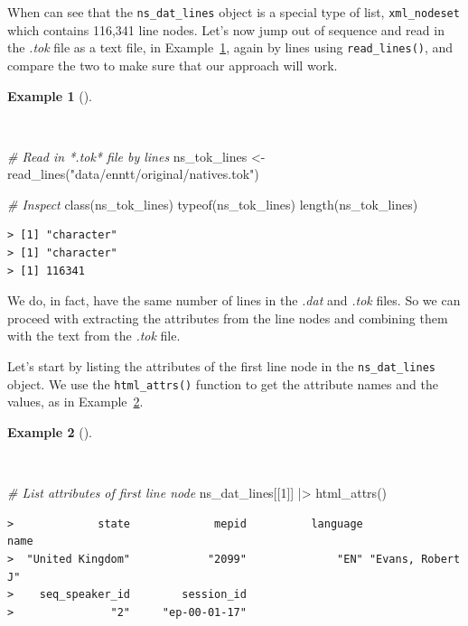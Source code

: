\documentclass[
  letterpaper,
  DIV=11,
  numbers=noendperiod]{scrreport}
\newenvironment{Shaded}{\begin{snugshade}}{\end{snugshade}}
\newcommand{\CommentTok}[1]{\textcolor[rgb]{0.00,0.00,0.00}{\textit{#1}}}
\newcommand{\DecValTok}[1]{\textcolor[rgb]{0.00,0.00,0.00}{#1}}
\newcommand{\FunctionTok}[1]{\textcolor[rgb]{0.00,0.00,0.00}{#1}}
\newcommand{\NormalTok}[1]{\textcolor[rgb]{0.00,0.00,0.00}{#1}}
\newcommand{\OtherTok}[1]{\textcolor[rgb]{0.00,0.00,0.00}{#1}}
\newcommand{\SpecialCharTok}[1]{\textcolor[rgb]{0.00,0.00,0.00}{#1}}
\newcommand{\StringTok}[1]{\textcolor[rgb]{0.00,0.00,0.00}{#1}}
\theoremstyle{definition}
\newtheorem{example}{Example}[chapter]
\theoremstyle{remark}
\begin{document}
When can see that the \texttt{ns\_dat\_lines} object is a special type
of list, \texttt{xml\_nodeset} which contains 116,341 line nodes. Let's
now jump out of sequence and read in the \emph{.tok} file as a text
file, in Example~\ref{exm-cd-enntt-read-lines}, again by lines using
\texttt{read\_lines()}, and compare the two to make sure that our
approach will work.

\begin{example}[]\protect\hypertarget{exm-cd-enntt-read-lines}{}\label{exm-cd-enntt-read-lines}

~

\begin{Shaded}
\begin{Highlighting}[]
\CommentTok{\# Read in *.tok* file by lines}
\NormalTok{ns\_tok\_lines }\OtherTok{\textless{}{-}} 
  \FunctionTok{read\_lines}\NormalTok{(}\StringTok{"data/enntt/original/natives.tok"}\NormalTok{)}

\CommentTok{\# Inspect}
\FunctionTok{class}\NormalTok{(ns\_tok\_lines)}
\FunctionTok{typeof}\NormalTok{(ns\_tok\_lines)}
\FunctionTok{length}\NormalTok{(ns\_tok\_lines)}
\end{Highlighting}
\end{Shaded}

\begin{verbatim}
> [1] "character"
> [1] "character"
> [1] 116341
\end{verbatim}

\end{example}

We do, in fact, have the same number of lines in the \emph{.dat} and
\emph{.tok} files. So we can proceed with extracting the attributes from
the line nodes and combining them with the text from the \emph{.tok}
file.

Let's start by listing the attributes of the first line node in the
\texttt{ns\_dat\_lines} object. We use the \texttt{html\_attrs()}
function to get the attribute names and the values, as in
Example~\ref{exm-cd-enntt-list-attributes}.

\begin{example}[]\protect\hypertarget{exm-cd-enntt-list-attributes}{}\label{exm-cd-enntt-list-attributes}

~

\begin{Shaded}
\begin{Highlighting}[]
\CommentTok{\# List attributes of first line node}
\NormalTok{ns\_dat\_lines[[}\DecValTok{1}\NormalTok{]] }\SpecialCharTok{|\textgreater{}} 
  \FunctionTok{html\_attrs}\NormalTok{()}
\end{Highlighting}
\end{Shaded}

\begin{verbatim}
>             state             mepid          language              name 
>  "United Kingdom"            "2099"              "EN" "Evans, Robert J" 
>    seq_speaker_id        session_id 
>               "2"     "ep-00-01-17"
\end{verbatim}

\end{example}
\end{document}

